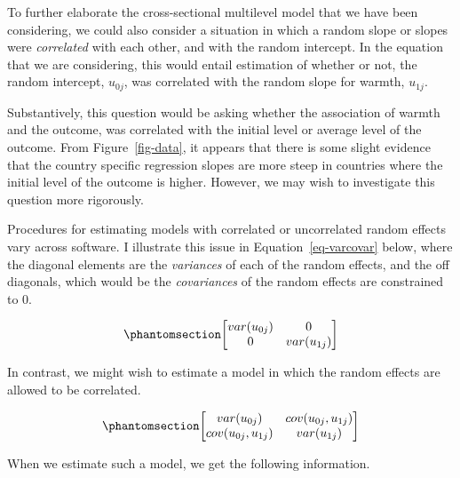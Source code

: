 \documentclass[
  letterpaper,
  DIV=11,
  numbers=noendperiod]{scrreprt}
\begin{document}
To further elaborate the cross-sectional multilevel model that we have
been considering, we could also consider a situation in which a random
slope or slopes were \emph{correlated} with each other, and with the
random intercept. In the equation that we are considering, this would
entail estimation of whether or not, the random intercept, \(u_{0j}\),
was correlated with the random slope for warmth, \(u_{1j}\).

Substantively, this question would be asking whether the association of
warmth and the outcome, was correlated with the initial level or average
level of the outcome. From Figure~\ref{fig-data}, it appears that there
is some slight evidence that the country specific regression slopes are
more steep in countries where the initial level of the outcome is
higher. However, we may wish to investigate this question more
rigorously.

Procedures for estimating models with correlated or uncorrelated random
effects vary across software. I illustrate this issue in
Equation~\ref{eq-varcovar} below, where the diagonal elements are the
\emph{variances} of each of the random effects, and the off diagonals,
which would be the \emph{covariances} of the random effects are
constrained to 0.

\begin{equation}\phantomsection\label{eq-varcovar}{\begin{bmatrix}
var(u_{0j}) & 0 \\
0 & var(u_{1j}) 
\end{bmatrix}}\end{equation}

In contrast, we might wish to estimate a model in which the random
effects are allowed to be correlated.

\begin{equation}\phantomsection\label{eq-varcovaruns}{\begin{bmatrix}
var(u_{0j}) & cov(u_{0j}, u_{1j}) \\
cov(u_{0j}, u_{1j}) & var(u_{1j}) 
\end{bmatrix}}\end{equation}

When we estimate such a model, we get the following information.
\end{document}
